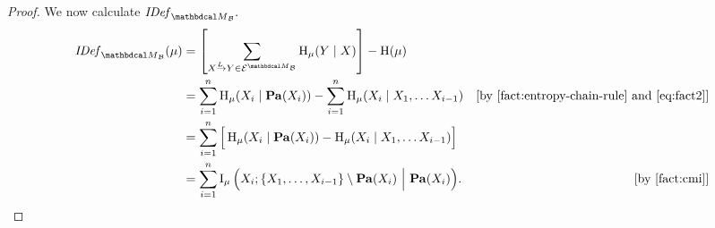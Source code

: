\begin{proof}
We now calculate $\IDef{\PDGof{\mathcal B}}.$
\begin{align*}
\IDef{\PDGof{\mathcal B}}(\mu)
 	&= \left[\sum_{\ed LXY \in \Ed^{\PDGof{\mathcal B}}} \H_\mu(Y\mid X) \right] - \H(\mu) \\
	&= \sum_{i=1}^n \H_\mu(X_i \mid \Pa(X_i)) - \sum_{i = 1}^n \H_\mu(X_i \mid X_1, \ldots X_{i-1}) & \text{[by \Cref{fact:entropy-chain-rule} and \eqref{eq:fact2}]}\\
	&= \sum_{i=1}^n \Big[\H_\mu(X_i \mid \Pa(X_i)) - \H_\mu(X_i \mid X_1, \ldots X_{i-1})\Big] \\
	&= \sum_{i=1}^n \I_\mu \Big( X_i ; \{X_1, \ldots, X_{i-1}\}\setminus \Pa(X_i) ~\Big|~ \Pa(X_i) \Big). & \text{[by \Cref{fact:cmi}]}
\end{align*}


\end{proof}
